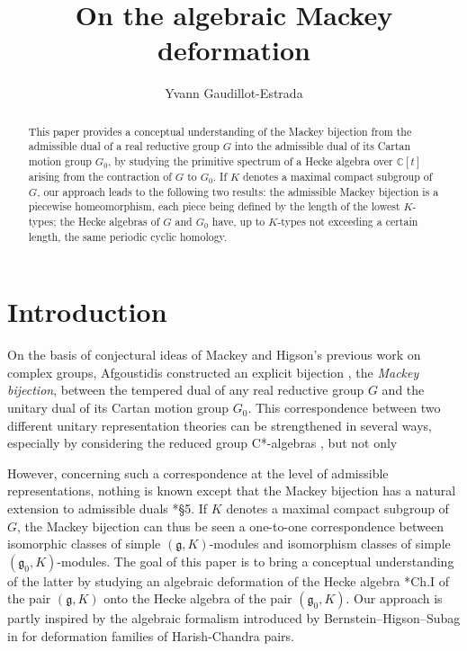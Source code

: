 \documentclass{amsart}
\title{On the algebraic Mackey deformation}
\author{Yvann Gaudillot-Estrada}
\theoremstyle{definition}
\begin{document}
\begin{abstract}
    This paper provides a conceptual understanding of the Mackey bijection from the admissible dual of a real reductive group $G$ into the admissible dual of its Cartan motion group $G_0$, by studying the primitive spectrum of a Hecke algebra over $\mathbb{C}[t]$ arising from the contraction of $G$ to $G_0$. If $K$ denotes a maximal compact subgroup of $G$, our approach leads to the following two results: the admissible Mackey bijection is a piecewise homeomorphism, each piece being defined by the length of the lowest $K$-types; the Hecke algebras of $G$ and $G_0$ have, up to $K$-types not exceeding a certain length, the same periodic cyclic homology.
\end{abstract}

\maketitle

\section*{Introduction}


On the basis of conjectural ideas of Mackey \cite{MackeyAnalogy} and Higson's previous work \cite{MAhigson} on complex groups, Afgoustidis constructed an explicit bijection \cite{Afgoustidis1}, the \textit{Mackey bijection}, between the tempered dual of any real reductive group $G$ and the unitary dual of its Cartan motion group $G_0$. This correspondence between two different unitary representation theories can be strengthened in several ways, especially by considering the reduced group C*-algebras \cites{Afgoustidis3,Membedding, AfgoustidisClare}, but not only \cites{AfgoustidisAubert, Yu}

However, concerning such a correspondence at the level of admissible representations, nothing is known except that the Mackey bijection has a natural extension to admissible duals \cite{Afgoustidis1}*{§5}. If $K$ denotes a maximal compact subgroup of $G$, the Mackey bijection can thus be seen a one-to-one correspondence between isomorphic classes of simple $(\mathfrak{g},K)$-modules and isomorphism classes of simple $(\mathfrak{g}_0,K)$-modules. The goal of this paper is to bring a conceptual understanding of the latter by studying an algebraic deformation of the Hecke algebra \cite{KnappVogan}*{Ch.I} of the pair $(\mathfrak{g},K)$ onto the Hecke algebra of the pair $(\mathfrak{g}_0,K)$. Our approach is partly inspired by the algebraic formalism introduced by Bernstein--Higson--Subag in \cite{BHS} for deformation families of Harish-Chandra pairs.
\end{document}

